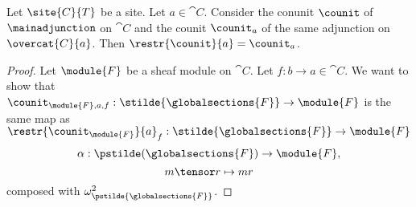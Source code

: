\begin{lemma}
Let $\site{C}{T}$ be a site.
Let $a \in \cat{C}$.
Consider the conunit $\counit$ of $\mainadjunction$ on $\cat{C}$
and the counit $\counit_a$ of the same adjunction on $\overcat{C}{a}$. 
Then $\restr{\counit}{a} = \counit_a$.
\end{lemma}
\begin{proof}
Let $\module{F}$ be a sheaf module on $\cat{C}$.
Let $f:b\rightarrow a\in \cat{C}$.
We want to show that 
$\counit_{\module{F},a,f}: \stilde{\globalsections{F}} \rightarrow \module{F}$
is the same map as $\restr{\counit_{\module{F}}}{a}_{f}: \stilde{\globalsections{F}} \rightarrow \module{F} $
\[\alpha:\pstilde(\globalsections{F}) \rightarrow \module{F},\]
\[m\tensor r \mapsto mr\]
composed with $\omega^2_{\pstilde{\globalsections{F}}}$.
\end{proof}